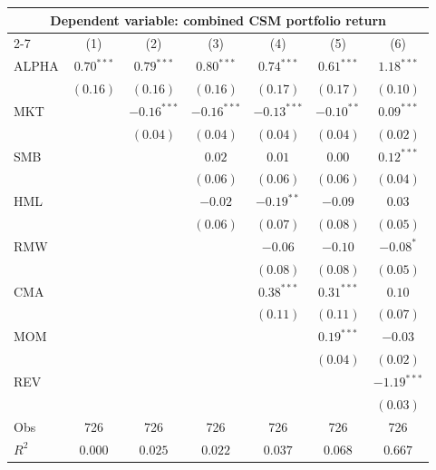 \documentclass[
]{article}
\begin{document}
\begin{tabular}{lcccccc}
  \hline \multicolumn{7}{c}{Dependent variable: combined CSM portfolio return} \\
 \cmidrule(l){2-7} \vspace{5pt}  & (1) & (2) & (3) & (4) & (5) & (6) \\ 
  ALPHA & $0.70^{***}$ & $0.79^{***}$ & $0.80^{***}$ & $0.74^{***}$ & $0.61^{***}$ & $1.18^{***}$ \\ 
   & $(0.16)$ & $(0.16)$ & $(0.16)$ & $(0.17)$ & $(0.17)$ & $(0.10)$ \\ 
  MKT &  & $-0.16^{***}$ & $-0.16^{***}$ & $-0.13^{***}$ & $-0.10^{**}$ & $0.09^{***}$ \\ 
   &  & $(0.04)$ & $(0.04)$ & $(0.04)$ & $(0.04)$ & $(0.02)$ \\ 
  SMB &  &  & $0.02$ & $0.01$ & $0.00$ & $0.12^{***}$ \\ 
   &  &  & $(0.06)$ & $(0.06)$ & $(0.06)$ & $(0.04)$ \\ 
  HML &  &  & $-0.02$ & $-0.19^{**}$ & $-0.09$ & $0.03$ \\ 
   &  &  & $(0.06)$ & $(0.07)$ & $(0.08)$ & $(0.05)$ \\ 
  RMW &  &  &  & $-0.06$ & $-0.10$ & $-0.08^{*}$ \\ 
   &  &  &  & $(0.08)$ & $(0.08)$ & $(0.05)$ \\ 
  CMA &  &  &  & $0.38^{***}$ & $0.31^{***}$ & $0.10$ \\ 
   &  &  &  & $(0.11)$ & $(0.11)$ & $(0.07)$ \\ 
  MOM &  &  &  &  & $0.19^{***}$ & $-0.03$ \\ 
   &  &  &  &  & $(0.04)$ & $(0.02)$ \\ 
  REV &  &  &  &  &  & $-1.19^{***}$ \\ 
   \vspace{5pt} &  &  &  &  &  & $(0.03)$ \\ 
  Obs & 726 & 726 & 726 & 726 & 726 & 726 \\ 
  $R^2$ & $0.000$ & $0.025$ & $0.022$ & $0.037$ & $0.068$ & $0.667$ \\ 
   \bottomrule\end{tabular}
\end{document}
